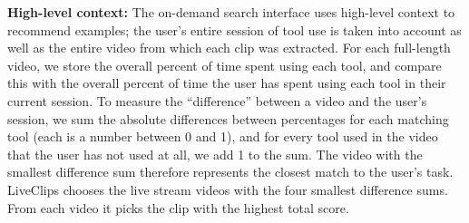 \textbf{High-level context:} The on-demand search interface uses high-level context to recommend examples; the user's entire session of tool use is taken into account as well as the entire video from which each clip was extracted. %
For each full-length video, we store the overall percent of time spent using each tool, and compare this with the overall percent of time the user has spent using each tool in their current session. To measure the ``difference'' between a video and the user's session, we sum the absolute differences between percentages for each matching tool (each is a number between 0 and 1), and for every tool used in the video that the user has not used at all, we add 1 to the sum. The video with the smallest difference sum therefore represents the closest match to the user's task. LiveClips chooses the live stream videos with the four smallest difference sums. From each video it picks the  clip with the highest total score.%



